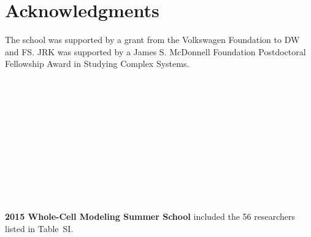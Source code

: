 \documentclass[journal,transmag]{IEEEtran}
\begin{document}
\section*{Acknowledgments}
The school was supported by a grant from the Volkswagen Foundation to DW and FS. JRK was supported by a James S. McDonnell Foundation Postdoctoral Fellowship Award in Studying Complex Systems.

\ifCLASSOPTIONcaptionsoff
  \newpage
\fi




% 

\begin{IEEEbiography}{}
~\\
~\\
~\\
~\\
~\\
~\\
~\\
~\\
~\\
~\\
~\\
\textbf{2015 Whole-Cell Modeling Summer School} included the 56 researchers listed in Table~SI.
\end{IEEEbiography}



\vfill

\end{document}
